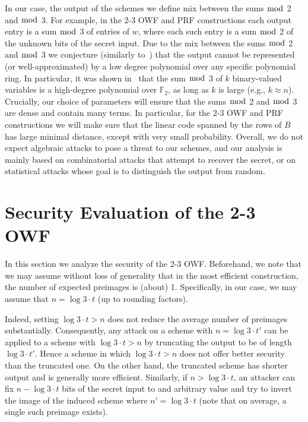 \documentclass[orivec,envcountsect]{llncs}
\begin{document}
In our case, the output of the schemes we define
mix between the sums $\bmod$ 2 and $\bmod$ 3.
For example, in the 2-3 OWF and PRF constructions each output entry is a sum $\bmod$ 3 of entries of $w$,
where each such entry is a sum $\bmod$ 2 of the unknown bits of the secret input.
Due to the mix between the sums $\bmod$ 2 and $\bmod$ 3 we conjecture (similarly to~\cite{BonehIPSW18}) that
the output cannot be represented (or well-approximated) by a low degree polynomial over any specific polynomial ring.
In particular, it was shown in~\cite{BonehIPSW18} that the sum $\bmod$ 3 of $k$ binary-valued variables is
a high-degree polynomial over $\mathbb{F}_2$,
as long as $k$ is large (e.g., $k \approx n$).
Crucially, our choice of parameters will ensure that the sums $\bmod$ 2 and $\bmod$ 3
are dense and contain many terms.
In particular, for the
2-3 OWF and PRF constructions
we will make sure that the linear code spanned by the rows of $B$ has large minimal distance,
except with very small probability.
Overall, we do not expect algebraic attacks to pose a threat to our schemes,
and our analysis is mainly based on combinatorial attacks that attempt to recover the secret,
or on statistical attacks whose goal is to distinguish the output from random.


\section{Security Evaluation of the 2-3 OWF}

In this section we analyze the security of the 2-3 OWF.
Beforehand, we note that we may assume without loss of generality that in the most efficient construction, the number of expected preimages is (about) 1. Specifically, in our case, we may assume that $n = \log 3 \cdot t$ (up to rounding factors).

Indeed, setting $\log 3 \cdot t > n$ does not reduce the average number of preimages substantially. Consequently, any attack on a scheme with $n = \log 3 \cdot t'$ can be applied to a scheme with $\log 3 \cdot t > n$ by truncating the output to be of length $\log 3 \cdot t'$. Hence a scheme in which $\log 3 \cdot t > n$ does not offer better security than the truncated one.
On the other hand, the truncated scheme has shorter output and is generally more efficient.
Similarly, if $n > \log 3 \cdot t$, an attacker can fix $n - \log 3 \cdot t$ bits of the secret input to and arbitrary value and try to invert the image of the induced scheme where $n' = \log 3 \cdot t$ (note that on average, a single such preimage exists).
\end{document}
